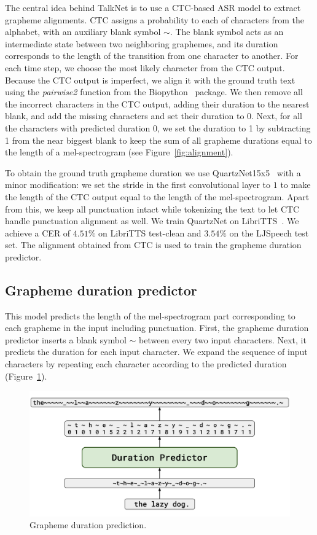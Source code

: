 The central idea behind TalkNet is to use a CTC-based ASR model to extract grapheme alignments. CTC assigns a probability to each of characters from the alphabet, with an auxiliary blank symbol $\sim$. The blank symbol acts as an intermediate state between two neighboring graphemes, and its duration corresponds to the length of the transition from one character to another. For each time step, we choose the most likely character from the CTC output. Because the CTC output is imperfect, we align it with the ground truth text using the \textit{pairwise2} function from the Biopython~\cite{biopython} package. We then remove all the incorrect characters in the CTC output, adding their duration to the nearest blank, and add the missing characters and set their duration to $0$. Next, for all the characters with predicted duration 0,  we set the duration to 1 by subtracting 1 from the near biggest blank to keep the sum of all grapheme durations equal to the length of a mel-spectrogram (see Figure~\ref{fig:alignment}).

To obtain the ground truth grapheme duration we use QuartzNet15x5~\cite{quartznet} with a minor modification: we set the stride in the first convolutional layer to $1$ to make the length of the CTC output equal to the length of the mel-spectrogram. Apart from this, we keep all punctuation intact while tokenizing the text to let CTC handle punctuation alignment as well. We train QuartzNet on LibriTTS~\cite{libritts}. We achieve a CER of $4.51\%$ on LibriTTS test-clean and $3.54\%$ on the LJSpeech test set. The alignment obtained from CTC is used to train the grapheme duration predictor.

\subsection{Grapheme duration predictor}

This model predicts the length of the mel-spectrogram part corresponding to each gra\-pheme in the input including punctuation. First, the grapheme duration predictor inserts a blank symbol $\sim$ between every two input characters. Next, it predicts the duration for each input character. We expand the sequence of input characters by repeating each character according to the predicted duration  (Figure~\ref{fig:durs}).

\begin{figure}[!ht]
\centering
\includegraphics[width=1.0\linewidth]{images/durs.png}
\caption{Grapheme duration prediction.}
\label{fig:durs}
\end{figure}

